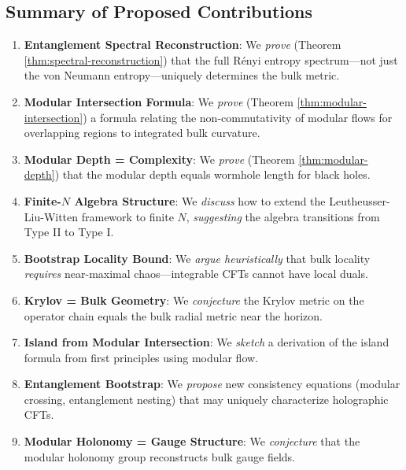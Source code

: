 \documentclass[12pt,a4paper]{article}
\begin{document}
\subsection{Summary of Proposed Contributions}

\begin{enumerate}
    \item \textbf{Entanglement Spectral Reconstruction}: We \textit{prove} (Theorem \ref{thm:spectral-reconstruction}) that the full R\'enyi entropy spectrum---not just the von Neumann entropy---uniquely determines the bulk metric.
    
    \item \textbf{Modular Intersection Formula}: We \textit{prove} (Theorem \ref{thm:modular-intersection}) a formula relating the non-commutativity of modular flows for overlapping regions to integrated bulk curvature.
    
    \item \textbf{Modular Depth = Complexity}: We \textit{prove} (Theorem \ref{thm:modular-depth}) that the modular depth equals wormhole length for black holes.
    
    \item \textbf{Finite-$N$ Algebra Structure}: We \textit{discuss} how to extend the Leutheusser-Liu-Witten framework to finite $N$, \textit{suggesting} the algebra transitions from Type II to Type I.
    
    \item \textbf{Bootstrap Locality Bound}: We \textit{argue heuristically} that bulk locality \textit{requires} near-maximal chaos---integrable CFTs cannot have local duals.
    
    \item \textbf{Krylov = Bulk Geometry}: We \textit{conjecture} the Krylov metric on the operator chain equals the bulk radial metric near the horizon.
    
    \item \textbf{Island from Modular Intersection}: We \textit{sketch} a derivation of the island formula from first principles using modular flow.
    
    \item \textbf{Entanglement Bootstrap}: We \textit{propose} new consistency equations (modular crossing, entanglement nesting) that may uniquely characterize holographic CFTs.
    
    \item \textbf{Modular Holonomy = Gauge Structure}: We \textit{conjecture} that the modular holonomy group reconstructs bulk gauge fields.
    

\end{enumerate}
\end{document}
